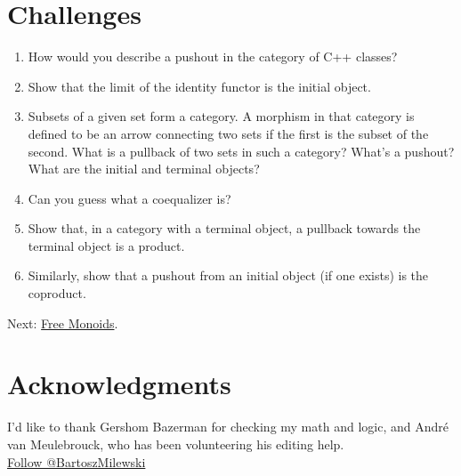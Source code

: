 \section{Challenges}\label{challenges}

\begin{enumerate}
\tightlist
\item
  How would you describe a pushout in the category of C++ classes?
\item
  Show that the limit of the identity functor
   is the initial object.
\item
  Subsets of a given set form a category. A morphism in that category is
  defined to be an arrow connecting two sets if the first is the subset
  of the second. What is a pullback of two sets in such a category?
  What's a pushout? What are the initial and terminal objects?
\item
  Can you guess what a coequalizer is?
\item
  Show that, in a category with a terminal object, a pullback towards
  the terminal object is a product.
\item
  Similarly, show that a pushout from an initial object (if one exists)
  is the coproduct.
\end{enumerate}

Next: \href{https://bartoszmilewski.com/2015/07/21/free-monoids/}{Free
Monoids}.

\section{Acknowledgments}\label{acknowledgments}

I'd like to thank Gershom Bazerman for checking my math and logic, and
André van Meulebrouck, who has been volunteering his editing help.\\
\href{https://twitter.com/BartoszMilewski}{Follow @BartoszMilewski}
